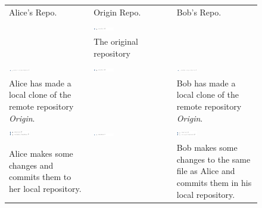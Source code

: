 \begin{figure}[htbp]
  \begin{tabulary}{\textwidth}{LLL}
    Alice's Repo. & Origin Repo. & Bob's Repo.\\

    &
    \includegraphics[width=0.27\textwidth]{Figures/background/foxtrot/origin_1.png} &
    \\
    & \tiny{The original repository} & \\

        \includegraphics[width=0.27\textwidth]{Figures/background/foxtrot/alice_1.png} &
    \includegraphics[width=0.27\textwidth]{Figures/background/foxtrot/origin_1.png} &
    \includegraphics[width=0.27\textwidth]{Figures/background/foxtrot/alice_1.png} \\

    \tiny{
    Alice has made a local clone of the remote repository
    \textit{Origin}.}
    &
    &
    \tiny{Bob has made a local clone of the remote repository
    \textit{Origin}.}
  \\\hline

    \includegraphics[width=0.27\textwidth]{Figures/background/foxtrot/alice_2.png} &
    \includegraphics[width=0.27\textwidth]{Figures/background/foxtrot/origin_1.png} &
    \includegraphics[width=0.27\textwidth]{Figures/background/foxtrot/bob_2.png} \\

    \tiny{Alice makes some changes and commits them to her local repository.}
    &
    &
    \tiny{Bob makes some changes to the same file as Alice and commits them in
    his local repository.}
    \\\hline



\end{tabulary}
\end{figure}

